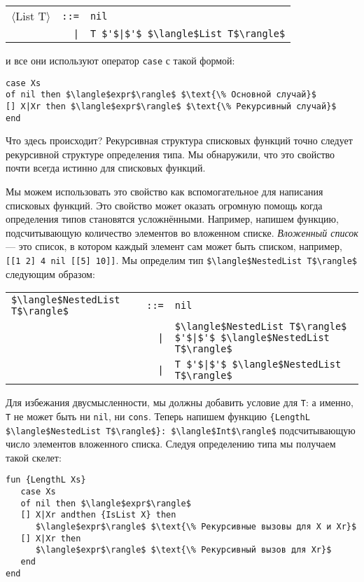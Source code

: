 \begin{tabular}{lrl}
  $\langle$List T$\rangle$ & \lstinline!::=! & \lstinline!nil! \\
  & \lstinline!|! & \lstinline!T $'$|$'$ $\langle$List T$\rangle$!
\end{tabular}

и все они используют оператор \lstinline!case! с такой формой:

\begin{lstlisting}
case Xs
of nil then $\langle$expr$\rangle$ $\text{\% Основной случай}$
[] X|Xr then $\langle$expr$\rangle$ $\text{\% Рекурсивный случай}$
end
\end{lstlisting}

Что здесь происходит? Рекурсивная структура списковых функций точно следует рекурсивной структуре определения типа. Мы обнаружили, что это свойство почти всегда истинно для списковых функций.

Мы можем использовать это свойство как вспомогательное для написания списковых функций. Это свойство может оказать огромную помощь когда определения типов становятся усложнёнными. Например, напишем функцию, подсчитывающую количество элементов во вложенном списке. \emph{Вложенный список} --- это список, в котором каждый элемент сам может быть списком, например, \lstinline![[1 2] 4 nil [[5] 10]]!. Мы определим тип \lstinline!$\langle$NestedList T$\rangle$! следующим образом:

\begin{tabular}{lrl}
  \lstinline!$\langle$NestedList T$\rangle$! & \lstinline!::=! & \lstinline!nil! \\
  & \lstinline!|! & \lstinline!$\langle$NestedList T$\rangle$ $'$|$'$ $\langle$NestedList T$\rangle$! \\
  & \lstinline!|! & \lstinline!T $'$|$'$ $\langle$NestedList T$\rangle$!
\end{tabular}

Для избежания двусмысленности, мы должны добавить условие для \lstinline!T!: а именно, \lstinline!T! не может быть ни \lstinline!nil!, ни \lstinline!cons!. Теперь напишем функцию \lstinline!{LengthL $\langle$NestedList T$\rangle$}: $\langle$Int$\rangle$! подсчитывающую число элементов вложенного списка. Следуя определению типа мы получаем такой скелет:

\begin{lstlisting}
fun {LengthL Xs}
   case Xs
   of nil then $\langle$expr$\rangle$
   [] X|Xr andthen {IsList X} then
      $\langle$expr$\rangle$ $\text{\% Рекурсивные вызовы для X и Xr}$
   [] X|Xr then
      $\langle$expr$\rangle$ $\text{\% Рекурсивный вызов для Xr}$
   end
end
\end{lstlisting}

